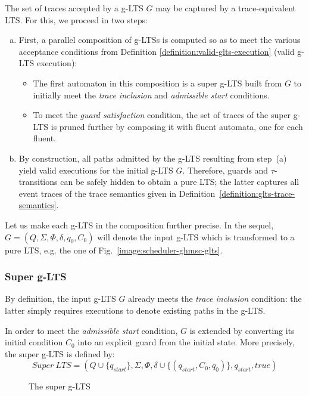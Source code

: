 The set of traces accepted by a g-LTS $G$ may be captured by a trace-equivalent LTS. For this, we proceed in two steps:
\begin{enumerate}[(a)]
\item First, a parallel composition of g-LTSs is computed so as to meet the various acceptance conditions from Definition \ref{definition:valid-glts-execution} (valid g-LTS execution):
\begin{itemize}
\item The first automaton in this composition is a super g-LTS built from $G$ to initially meet the \emph{trace inclusion} and \emph{admissible start} conditions.
\item To meet the \emph{guard satisfaction} condition, the set of traces of the super g-LTS is pruned further by composing it with fluent automata, one for each fluent.
\end{itemize}
\item By construction, all paths admitted by the g-LTS resulting from step~(a) yield valid executions for the initial g-LTS $G$. Therefore, guards and $\tau$-transitions can be safely hidden to obtain a pure LTS; the latter captures all event traces of the trace semantics given in Definition~\ref{definition:glts-trace-semantics}.
\end{enumerate}

Let us make each g-LTS in the composition further precise. In the sequel, $G = (Q,\Sigma,\Phi,\delta,q_{0},C_{0})$ will denote the input g-LTS which is transformed to a pure LTS, e.g. the one of Fig.~\ref{image:scheduler-ghmsc-glts}. 

\subsubsection*{Super g-LTS}

By definition, the input g-LTS $G$ already meets the \emph{trace inclusion} condition: the latter simply requires executions to denote existing paths in the g-LTS.

In order to meet the \emph{admissible start} condition, $G$ is extended by converting its initial condition $C_0$ into an explicit guard from the initial state. More precisely, the super g-LTS is defined by:
\begin{equation*}
Super~LTS = (Q \cup \{ q_{start} \}, \Sigma, \Phi, \delta \cup \{(q_{start},C_0,q_0)\},q_{start},true)
\end{equation*}

\begin{figure}[H]
\centering
{}
\caption{The super g-LTS\label{image:super-lts}}
\end{figure}

